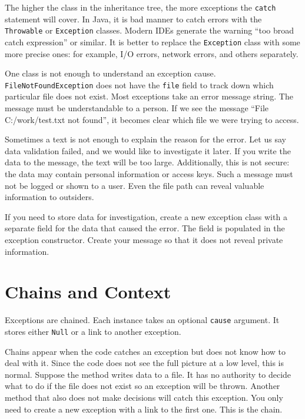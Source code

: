 The higher the class in the inheritance tree, the more exceptions the \verb|catch| statement will cover. In Java, it is bad manner to catch errors with the \verb|Throwable| or \verb|Exception| classes. Modern IDEs generate the warning ``too broad catch expression'' or similar. It is better to replace the \verb|Exception| class with some more precise ones: for example, I/O errors, network errors, and others separately.

One class is not enough to understand an exception cause.
\verb|FileNotFoundException| does not have the \verb|file| field to track down which particular file does not exist. Most exceptions take an error message string. The message must be understandable to a person.
If we see the message ``File C:/work/test.txt not found'', it becomes clear which file we were trying to access.


Sometimes a text is not enough to explain the reason for the error. Let us say data validation failed, and we would like to investigate it later. If you write the data to the message, the text will be too large. Additionally, this is not secure: the data may contain personal information or access keys. Such a message must not be logged or shown to a user. Even the file path can reveal valuable information to outsiders.

If you need to store data for investigation, create a new exception class with a separate field for the data that caused the error. The field is populated in the exception constructor. Create your message so that it does not reveal private information.

\section{Chains and Context}


Exceptions are chained. Each instance takes an optional \verb|cause| argument. It stores either \verb|Null| or a link to another exception.



Chains appear when the code catches an exception but does not know how to deal with it. Since the code does not see the full picture at a low level, this is normal. Suppose the method writes data to a file. It has no authority to decide what to do if the file does not exist so an exception will be thrown. Another method that also does not make decisions will catch this exception. You only need to create a new exception with a link to the first one. This is the chain.

